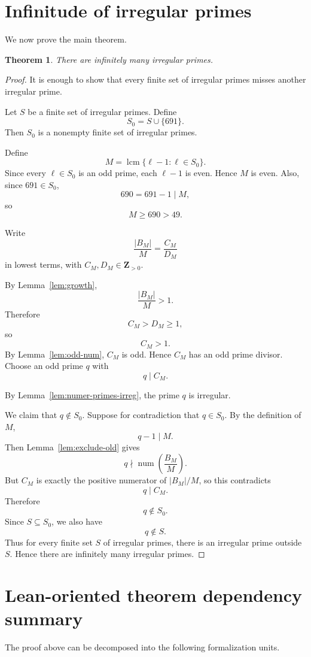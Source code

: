 \documentclass[11pt]{article}
\newtheorem{theorem}{Theorem}[section]
\newcommand{\Z}{\mathbf Z}
\newcommand{\num}{\operatorname{num}}
\newcommand{\lcm}{\operatorname{lcm}}
\begin{document}
\section{Infinitude of irregular primes}

We now prove the main theorem.

\begin{theorem}
There are infinitely many irregular primes.
\end{theorem}

\begin{proof}
It is enough to show that every finite set of irregular primes misses another irregular prime.

Let $S$ be a finite set of irregular primes.  Define
\[
  S_0=S\cup\{691\}.
\]
Then $S_0$ is a nonempty finite set of irregular primes.

Define
\[
  M=\lcm\{\ell-1:\ell\in S_0\}.
\]
Since every $\ell\in S_0$ is an odd prime, each $\ell-1$ is even.  Hence $M$ is even.  Also, since $691\in S_0$,
\[
  690=691-1\mid M,
\]
so
\[
  M\ge690>49.
\]

Write
\[
  \frac{|B_M|}{M}=\frac{C_M}{D_M}
\]
in lowest terms, with $C_M,D_M\in\Z_{>0}$.

By Lemma~\ref{lem:growth},
\[
  \frac{|B_M|}{M}>1.
\]
Therefore
\[
  C_M>D_M\ge1,
\]
so
\[
  C_M>1.
\]
By Lemma~\ref{lem:odd-num}, $C_M$ is odd.  Hence $C_M$ has an odd prime divisor.  Choose an odd prime $q$ with
\[
  q\mid C_M.
\]

By Lemma~\ref{lem:numer-primes-irreg}, the prime $q$ is irregular.

We claim that $q\notin S_0$.  Suppose for contradiction that $q\in S_0$.  By the definition of $M$,
\[
  q-1\mid M.
\]
Then Lemma~\ref{lem:exclude-old} gives
\[
  q\nmid \num\left(\frac{B_M}{M}\right).
\]
But $C_M$ is exactly the positive numerator of $|B_M|/M$, so this contradicts
\[
  q\mid C_M.
\]
Therefore
\[
  q\notin S_0.
\]
Since $S\subseteq S_0$, we also have
\[
  q\notin S.
\]
Thus for every finite set $S$ of irregular primes, there is an irregular prime outside $S$.  Hence there are infinitely many irregular primes.
\end{proof}

\section{Lean-oriented theorem dependency summary}

The proof above can be decomposed into the following formalization units.
\end{document}
